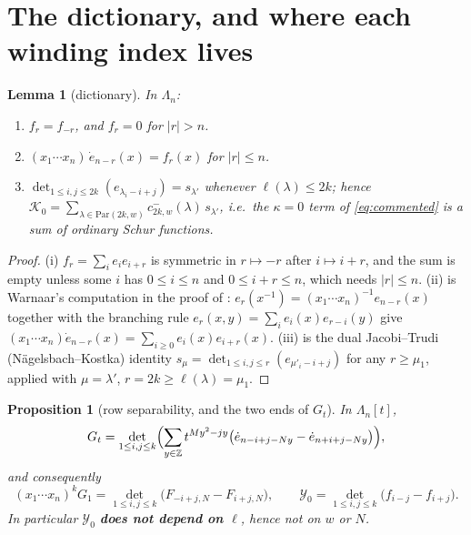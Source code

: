 \documentclass[11pt]{article}
\theoremstyle{plain}
\newtheorem{proposition}[theorem]{Proposition}
\newtheorem{lemma}[theorem]{Lemma}
\theoremstyle{definition}
\newcommand{\Par}{\mathrm{Par}}
\newcommand{\edot}{\dot{e}}
\newcommand{\Z}{\mathbb{Z}}
\newcommand{\Lam}{\Lambda_n}
\begin{document}
\section{The dictionary, and where each winding index lives}

\begin{lemma}[dictionary]\label{lem:dict}
In $\Lam$:
\begin{enumerate}
\item[(i)] $f_r=f_{-r}$, and $f_r=0$ for $|r|>n$.
\item[(ii)] $(x_1\cdots x_n)\,\edot_{n-r}(x)=f_r(x)$ for $|r|\le n$.
\item[(iii)] $\det_{1\le i,j\le 2k}(e_{\lambda_i-i+j})=s_{\lambda'}$ whenever
  $\ell(\lambda)\le 2k$; hence
  $\mathcal K_0=\sum_{\lambda\in\Par(2k,w)}c^-_{2k,w}(\lambda)\,s_{\lambda'}$, i.e.\ the
  $\kappa=0$ term of \eqref{eq:commented} is a sum of \emph{ordinary} Schur functions.
\end{enumerate}
\end{lemma}

\begin{proof}
(i) $f_r=\sum_ie_ie_{i+r}$ is symmetric in $r\mapsto-r$ after $i\mapsto i+r$, and the sum
is empty unless some $i$ has $0\le i\le n$ and $0\le i+r\le n$, which needs $|r|\le n$.
(ii) is Warnaar's computation in the proof of \cite[Lem.~4.2, source line 1148]{W}:
$e_r(x^{-1})=(x_1\cdots x_n)^{-1}e_{n-r}(x)$ together with the branching rule
$e_r(x,y)=\sum_ie_i(x)e_{r-i}(y)$ give
$(x_1\cdots x_n)\edot_{n-r}(x)=\sum_{i\ge0}e_i(x)e_{i+r}(x)$.
(iii) is the dual Jacobi--Trudi (N\"agelsbach--Kostka) identity
$s_\mu=\det_{1\le i,j\le r}(e_{\mu'_i-i+j})$ for any $r\ge\mu_1$, applied with
$\mu=\lambda'$, $r=2k\ge\ell(\lambda)=\mu_1$.
\end{proof}

\begin{proposition}[row separability, and the two ends of $G_t$]\label{prop:sep}
In $\Lam[t]$,
\begin{equation}\label{eq:sep}
  G_t=\det_{1\le i,j\le k}\Bigl(\sum_{y\in\Z}t^{My^2-jy}
     \bigl(\edot_{n-i+j-Ny}-\edot_{n+i+j-Ny}\bigr)\Bigr),
\end{equation}
and consequently
\begin{equation}\label{eq:ends}
  (x_1\cdots x_n)^kG_1=\det_{1\le i,j\le k}\bigl(F_{-i+j,N}-F_{i+j,N}\bigr),
  \qquad
  \mathcal Y_0=\det_{1\le i,j\le k}\bigl(f_{i-j}-f_{i+j}\bigr).
\end{equation}
In particular $\mathcal Y_0$ \textbf{does not depend on $\ell$}, hence not on $w$ or $N$.
\end{proposition}
\end{document}

